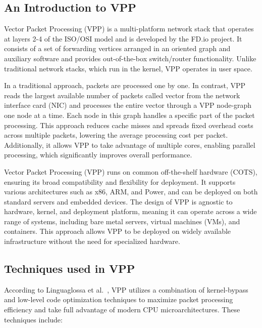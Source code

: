 \subsection{An Introduction to VPP}

Vector Packet Processing (VPP) is a multi-platform network stack that operates at layers 2-4 of the ISO/OSI model and is developed by the FD.io project. 
It consists of a set of forwarding vertices arranged in an oriented graph and auxiliary software and provides out-of-the-box switch/router functionality.
Unlike traditional network stacks, which run in the kernel, VPP operates in user space.

In a traditional approach, packets are processed one by one. In contrast, VPP reads the largest available number of packets called vector from the network interface card (NIC) 
and processes the entire vector through a VPP node-graph one node at a time. Each node in this graph handles a specific part of the packet processing.
This approach reduces cache misses and spreads fixed overhead costs across multiple packets, lowering the average processing cost per packet. 
Additionally, it allows VPP to take advantage of multiple cores, enabling parallel processing, which significantly improves overall performance.

Vector Packet Processing (VPP) runs on common off-the-shelf hardware (COTS), ensuring its broad compatibility and flexibility for deployment. 
It supports various architectures such as x86, ARM, and Power, and can be deployed on both standard servers and embedded devices. 
The design of VPP is agnostic to hardware, kernel, and deployment platform, meaning it can operate across a wide range of systems, including bare metal servers, virtual machines (VMs), and containers. 
This approach allows VPP to be deployed on widely available infrastructure without the need for specialized hardware.~\cite{fdio_what_is_vpp}

\subsection{Techniques used in VPP}
According to Linguaglossa et al.~\cite{LINGUAGLOSSA}, 
VPP utilizes a combination of kernel-bypass and low-level code optimization techniques to maximize packet processing efficiency and take full advantage of modern CPU microarchitectures.
These techniques include:

